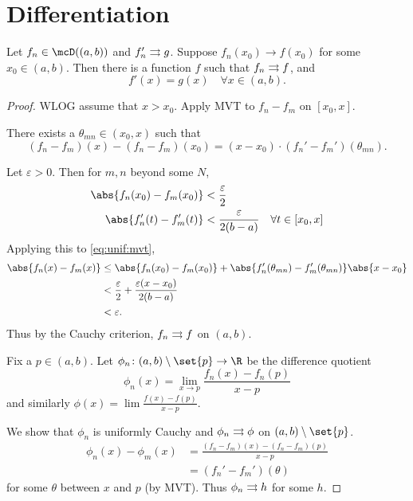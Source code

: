 \section{Differentiation} \label{sec:ssfn:diff}
\begin{theorem}
    Let $f_n \in \mcD((a, b))$ and $f_n' \rightrightarrows g$.
    Suppose $f_n(x_0) \to f(x_0)$ for some $x_0 \in (a, b)$.
    Then there is a function $f$ such that $f_n \rightrightarrows f$, and \[
        f'(x) = g(x) \quad \forall x \in (a, b).
    \]
\end{theorem}
\begin{proof}
    WLOG assume that $x > x_0$.
    Apply MVT to $f_n - f_m$ on $[x_0, x]$.

    There exists a $\theta_{m n} \in (x_0, x)$ such that \begin{equation}
        (f_n - f_m)(x) - (f_n - f_m)(x_0)
            = (x - x_0) \cdot (f_n' - f_m')(\theta_{m n}).
            \label{eq:unif:mvt}
    \end{equation}

    Let $\varepsilon > 0$.
    Then for $m, n$ beyond some $N$, \begin{align*}
        \abs{f_n(x_0) - f_m(x_0)} &< \frac{\varepsilon}{2} \\
        \abs{f_n'(t) - f_m'(t)} &< \frac{\varepsilon}{2(b-a)}
                                \quad \forall t \in [x_0, x]
    \end{align*}
    Applying this to \cref{eq:unif:mvt}, \begin{align*}
        \abs{f_n(x) - f_m(x)}
        &\le \abs{f_n(x_0) - f_m(x_0)}
            + \abs{f_n'(\theta_{m n}) - f_m'(\theta_{m n})} \abs{x - x_0} \\
        &< \frac{\varepsilon}{2} + \frac{\varepsilon(x-x_0)}{2(b-a)} \\
        &< \varepsilon.
    \end{align*}
    Thus by the Cauchy criterion, $f_n \rightrightarrows f$ on $(a, b)$.

    Fix a $p \in (a, b)$.
    Let $\phi_n\colon (a, b) \setminus \set{p} \to \R$ be the difference
    quotient \[
        \phi_n(x) = \lim_{x \to p} \frac{f_n(x) - f_n(p)}{x - p}
    \] and similarly $\phi(x) = \lim \frac{f(x) - f(p)}{x - p}$.

    We show that $\phi_n$ is uniformly Cauchy and $\phi_n \rightrightarrows \phi$
    on $(a, b) \setminus \set{p}$.
    \begin{align*}
        \phi_n(x) - \phi_m(x)
        &= \frac{(f_n - f_m)(x) - (f_n - f_m)(p)}{x - p} \\
        &= (f_n' - f_m')(\theta)
    \end{align*} for some $\theta$ between $x$ and $p$ (by MVT).
    Thus $\phi_n \rightrightarrows h$ for some $h$.


\end{proof}
